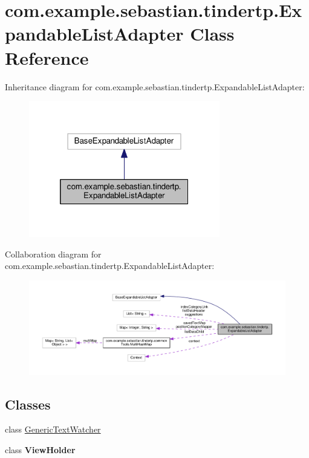 \hypertarget{classcom_1_1example_1_1sebastian_1_1tindertp_1_1ExpandableListAdapter}{}\section{com.\+example.\+sebastian.\+tindertp.\+Expandable\+List\+Adapter Class Reference}
\label{classcom_1_1example_1_1sebastian_1_1tindertp_1_1ExpandableListAdapter}


Inheritance diagram for com.\+example.\+sebastian.\+tindertp.\+Expandable\+List\+Adapter\+:\nopagebreak
\begin{figure}[H]
\begin{center}
\leavevmode
\includegraphics[width=236pt]{classcom_1_1example_1_1sebastian_1_1tindertp_1_1ExpandableListAdapter__inherit__graph}
\end{center}
\end{figure}


Collaboration diagram for com.\+example.\+sebastian.\+tindertp.\+Expandable\+List\+Adapter\+:\nopagebreak
\begin{figure}[H]
\begin{center}
\leavevmode
\includegraphics[width=350pt]{classcom_1_1example_1_1sebastian_1_1tindertp_1_1ExpandableListAdapter__coll__graph}
\end{center}
\end{figure}
\subsection*{Classes}
\begin{DoxyCompactItemize}
\item 
class \hyperlink{classcom_1_1example_1_1sebastian_1_1tindertp_1_1ExpandableListAdapter_1_1GenericTextWatcher}{Generic\+Text\+Watcher}
\item 
class {\bfseries View\+Holder}
\end{DoxyCompactItemize}
